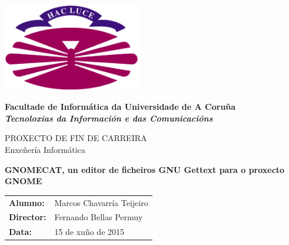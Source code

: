 %
%

%

\begin{titlepage}

	\begin{center}

		\includegraphics[width=6cm]{./eps/logo_udc.eps}
		\vspace{2cm}

		{\Large{\textbf{Facultade de Informática da Universidade de A Coruña}}}
		\\
		{\it \large{\textbf{Tecnoloxías da Información e das Comunicacións}}}
		\vspace{1cm}

		{\large PROXECTO DE FIN DE CARREIRA\\Enxeñería Informática}
		\vspace{1cm}

		\textbf{\Large GNOMECAT, un editor de ficheiros GNU Gettext para o proxecto GNOME}
		\vspace{7cm}
	\end{center}

	\begin{flushright}
		\begin{tabular}{ll}
			\large{\textbf{Alumno:}}	&
			\large{Marcos Chavarría Teijeiro} \\

			\large{\textbf{Director:}}	&
			\large{Fernando Bellas Permuy} \\

			\large{\textbf{Data:}}	&
			\large{15 de xuño de 2015} \\
		\end{tabular}
	\end{flushright}

\end{titlepage}
